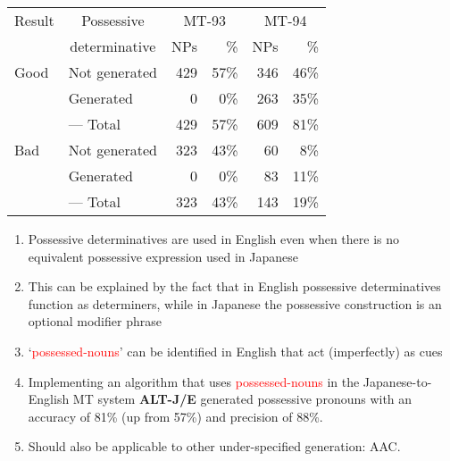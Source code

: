 \documentclass[a4paper,landscape,headrule,footrule,dvips]{foils}
\newcommand{\trg}[1]{\textcolor{red}{#1}}
\begin{document}
\begin{CJK}{UTF8}{min}
\begin{center}
    \begin{tabular}{|l|l|rr|rr|} \hline
      Result & \multicolumn{1}{c|}{Possessive}  &
      \multicolumn{2}{c|}{MT-93} & \multicolumn{2}{c|}{MT-94}\\ 
      & \multicolumn{1}{c|}{determinative}     & NPs & \%& NPs & \% \\ \hline
      Good & Not generated & 429 & 57\% & 346  & 46\%\\
      & Generated     &   0 & 0\%  & 263  & 35\%\\ \cline{2-6}
      & --- Total & 429 &  57\% & 609 & 81\%  \\ \hline
      Bad  & Not generated & 323 & 43\% &  60 & 8\% \\
      & Generated     &   0 & 0\%  &  83 & 11\% \\ \cline{2-6}
      & --- Total     &  323 & 43\% & 143 & 19\%  \\  \hline 
    \end{tabular}
  \end{center}



  \begin{enumerate}
  \item Possessive determinatives are used in English even when there
    is no equivalent possessive expression used in Japanese
  \item This can be explained by the fact that in English possessive
    determinatives function as determiners, while in Japanese the
    possessive construction is an optional modifier phrase
  \item `\trg{possessed-nouns}' can be identified in English that act
    (imperfectly) as cues
  \item Implementing an algorithm  that uses
    \trg{possessed-nouns} in the Japanese-to-English MT system {\bf
      ALT-J/E} generated possessive pronouns with an accuracy of
    81\% (up from 57\%) and precision of 88\%.
  \item Should also be applicable to other under-specified generation: AAC.
  \end{enumerate}





\end{CJK}
\end{document}

